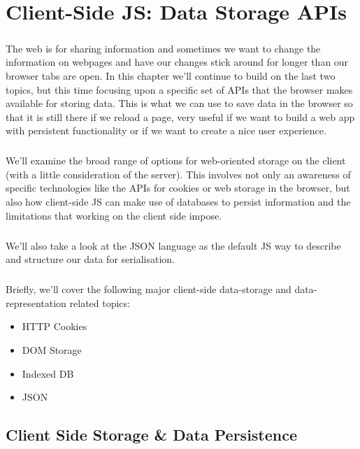 \chapter{Client-Side JS: Data Storage APIs}
\label{data-storage}
\paragraph{} The web is for sharing information and sometimes we want to change the information on webpages and have our changes stick around for longer than our browser tabs are open. In this chapter we'll continue to build on the last two topics, but this time focusing upon a specific set of APIs that the browser makes available for storing data. This is what we can use to save data in the browser so that it is still there if we reload a page, very useful if we want to build a web app with persistent functionality or if we want to create a nice user experience. 
\paragraph{} We’ll examine the broad range of options for web-oriented storage on the client (with a little consideration of the server). This involves not only an awareness of specific technologies like the APIs for cookies or web storage in the browser, but also how client-side JS can make use of databases to persist information and the limitations that working on the client side impose.
\paragraph{} We'll also take a look at the JSON language as the default JS way to describe and structure our data for serialisation.
\paragraph{} Briefly, we'll cover the following major client-side data-storage and data-representation related topics:

\begin{itemize}
\item HTTP Cookies
\item DOM Storage
\item Indexed DB
\item JSON
\end{itemize} 


\section{Client Side Storage \& Data Persistence}
